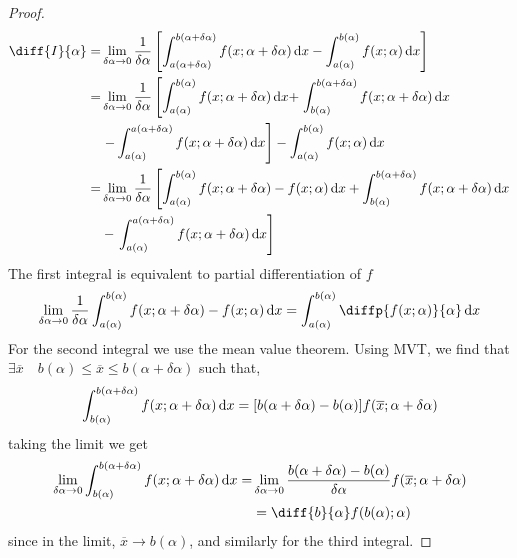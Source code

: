 \documentclass{article}
\begin{document}
\begin{proof}
    \begin{align*}
        \diff{I}{\alpha} =& \lim_{\delta \alpha \rightarrow 0} \frac{1}{\delta \alpha} \left[\int_{a(\alpha + \delta \alpha)}^{b(\alpha + \delta \alpha)}{f(x ; \alpha + \delta \alpha) \diffd x} - \int_{a(\alpha)}^{b(\alpha)}{f(x ; \alpha) \diffd x}\right] \\
        =&\lim_{\delta \alpha \rightarrow 0} \frac{1}{\delta \alpha} \left[\int_{a(\alpha)}^{b(\alpha)}{f(x ; \alpha + \delta \alpha) \diffd x} +\right. \int_{b(\alpha)}^{b(\alpha + \delta \alpha)}{f(x ; \alpha + \delta \alpha) \diffd x} \\ 
        &\left. - \int_{a(\alpha)}^{a(\alpha + \delta \alpha)}{f(x ; \alpha + \delta \alpha) \diffd x} \right] - \int_{a(\alpha)}^{b(\alpha)}{f(x ; \alpha) \diffd x} \\
        =&\lim_{\delta \alpha \rightarrow 0} \frac{1}{\delta \alpha} \left[ \int_{a(\alpha)}^{b(\alpha)}{f(x ; \alpha + \delta \alpha) - f(x ; \alpha) \diffd x} + \int_{b(\alpha)}^{b(\alpha + \delta \alpha)}{f(x ; \alpha + \delta \alpha) \diffd x}\right.\\
        &-  \left.\int_{a(\alpha)}^{a(\alpha + \delta \alpha)}{f(x ; \alpha + \delta \alpha) \diffd x} \right]
    \end{align*}
    The first integral is equivalent to partial differentiation of $f$
    \[
        \lim_{\delta \alpha \rightarrow 0} \frac{1}{\delta \alpha} \int_{a(\alpha)}^{b(\alpha)}{f(x ; \alpha + \delta \alpha) - f(x ; \alpha) \diffd x} = \int_{a(\alpha)}^{b(\alpha)}{\diffp{f(x ; \alpha)}{\alpha} \diffd x}
    \]
    For the second integral we use the mean value theorem. Using MVT, we find that $\exists \overline{x} \quad b(\alpha) \leq \overline{x} \leq b(\alpha + \delta \alpha)$ such that,
    \[
        \int_{b(\alpha)}^{b(\alpha + \delta \alpha)}{f(x ; \alpha + \delta \alpha) \mathop{}\!\mathrm{d} x} = [b(\alpha + \delta \alpha) - b(\alpha)]f(\overline{x} ; \alpha + \delta \alpha)
    \]
    taking the limit we get
    \begin{align*}
        \lim_{\delta \alpha \rightarrow 0} \int_{b(\alpha)}^{b(\alpha + \delta \alpha)}{f(x ; \alpha + \delta \alpha) \diffd x} =& \lim_{\delta \alpha \rightarrow 0} \frac{b(\alpha + \delta \alpha) - b(\alpha)}{\delta \alpha}f(\overline{x} ; \alpha + \delta \alpha) \\
        &= \diff{b}{\alpha}f(b(\alpha); \alpha)
    \end{align*}
    since in the limit, $\overline{x} \rightarrow b(\alpha)$, and similarly for the third integral.
\end{proof}
\end{document}
